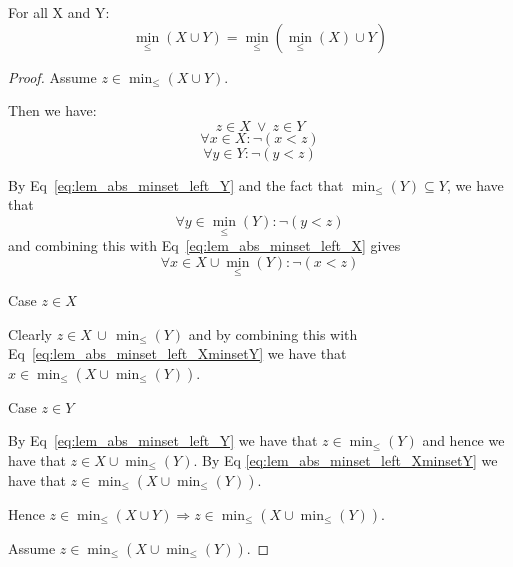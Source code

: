
\begin{lemma} \label{lem:minunion_left_absorption}
For all X and Y:
\begin{equation*}
\min_\leq(X \cup Y) = \min_\leq(\min_\leq(X) \cup Y)
\end{equation*}
\end{lemma}

\begin{proof}
Assume $z \in \min_\leq(X \cup Y)$. 
\begin{ind}
Then we have:
\begin{equation}
z \in X \ \vee \ z \in Y
\end{equation}
\begin{equation} \label{eq:lem_abs_minset_left_X}
\forall x \in X : \neg (x < z)
\end{equation}
\begin{equation} \label{eq:lem_abs_minset_left_Y}
\forall y \in Y : \neg (y < z)
\end{equation}

By Eq~\ref{eq:lem_abs_minset_left_Y} and the fact that $\min_\leq(Y) \subseteq Y$, we have that
\begin{equation*} 
\forall y \in \min_\leq(Y) : \neg (y < z)
\end{equation*}
and combining this with Eq~\ref{eq:lem_abs_minset_left_X} gives
\begin{equation} \label{eq:lem_abs_minset_left_XminsetY}
\forall x \in X \cup \min_\leq(Y) : \neg (x < z)
\end{equation}

Case $z \in X$
\begin{ind}
Clearly $z \in X \, \cup \, \min_\leq(Y)$ and by combining this with Eq~\ref{eq:lem_abs_minset_left_XminsetY} we have that $x \in \min_\leq(X \cup \min_\leq(Y))$.
\end{ind}

Case $z \in Y$
\begin{ind}
By Eq~\ref{eq:lem_abs_minset_left_Y} we have that $z \in \min_\leq(Y)$ and hence we have that $z \in X \cup \min_\leq(Y)$. By Eq \ref{eq:lem_abs_minset_left_XminsetY} we have that $z \in \min_\leq(X \cup \min_\leq(Y))$.
\end{ind}

Hence $z \in \min_\leq(X \cup Y) \Rightarrow z \in \min_\leq(X \cup \min_\leq(Y))$.
\end{ind}

\vspace{2em}

Assume $z \in \min_\leq(X \cup \min_\leq(Y))$.


\end{proof}
